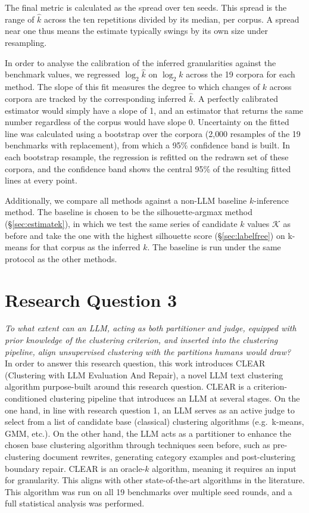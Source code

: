 \documentclass[11pt,a4paper,oneside]{report}
\begin{document}
The final metric is calculated as the spread over ten seeds. This spread is the range of $\hat{k}$ across the ten repetitions divided by its median, per corpus. A spread near one thus means the estimate typically swings by its own size under resampling.

In order to analyse the calibration of the inferred granularities against the benchmark values, we regressed $\log_2 \hat{k}$ on $\log_2 k$ across the 19 corpora for each method. The slope of this fit measures the degree to which changes of $k$ across corpora are tracked by the corresponding inferred $\hat{k}$. A perfectly calibrated estimator would simply have a slope of 1, and an estimator that returns the same number regardless of the corpus would have slope 0. Uncertainty on the fitted line was calculated using a bootstrap over the corpora (2{,}000 resamples of the 19 benchmarks with replacement), from which a 95\% confidence band is built. In each bootstrap resample, the regression is refitted on the redrawn set of these corpora, and the confidence band shows the central 95\% of the resulting fitted lines at every point.

Additionally, we compare all methods against a non-LLM baseline $k$-inference method. The baseline is chosen to be the silhouette-argmax method (\S\ref{sec:estimatek}), in which we test the same series of candidate $k$ values $\mathcal{K}$ as before and take the one with the highest silhouette score (\S\ref{sec:labelfree}) on k-means for that corpus as the inferred $k$. The baseline is run under the same protocol as the other methods.

\section{Research Question 3}

\emph{To what extent can an LLM, acting as both partitioner and judge, equipped with prior knowledge of the clustering criterion, and inserted into the clustering pipeline, align unsupervised clustering with the partitions humans would draw?}\\

In order to answer this research question, this work introduces CLEAR (Clustering with LLM Evaluation And Repair), a novel LLM text clustering algorithm purpose-built around this research question. CLEAR is a criterion-conditioned clustering pipeline that introduces an LLM at several stages. On the one hand, in line with research question 1, an LLM serves as an active judge to select from a list of candidate base (classical) clustering algorithms (e.g.\ k-means, GMM, etc.). On the other hand, the LLM acts as a partitioner to enhance the chosen base clustering algorithm through techniques seen before, such as pre-clustering document rewrites, generating category examples and post-clustering boundary repair. CLEAR is an oracle-$k$ algorithm, meaning it requires an input for granularity. This aligns with other state-of-the-art algorithms in the literature. This algorithm was run on all 19 benchmarks over multiple seed rounds, and a full statistical analysis was performed.
\end{document}

